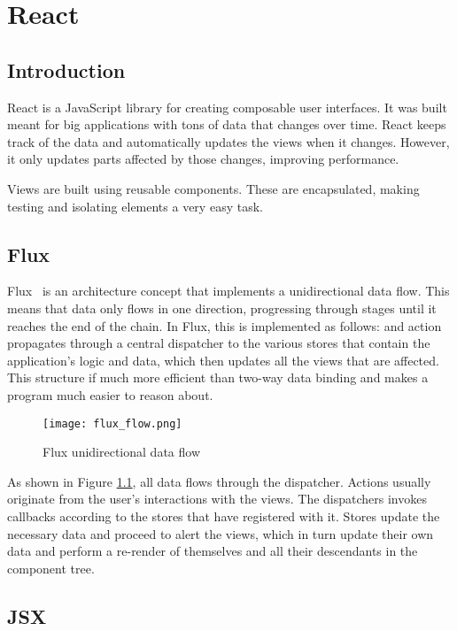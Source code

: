 \chapter{React}
\label{ch:react}
\justifying
\section{Introduction}

React is a JavaScript library for creating composable user interfaces. It was built meant for big applications with tons of data that changes over time. React keeps track of the data and automatically updates the views when it changes. However, it only updates parts affected by those changes, improving performance.

Views are built using reusable components. These are encapsulated, making testing and isolating elements a very easy task.

\section{Flux}

Flux~\cite{flux} is an architecture concept that implements a unidirectional data flow. This means that data only flows in one direction, progressing through stages until it reaches the end of the chain. In Flux, this is implemented as follows: and  action propagates through a central dispatcher to the various stores that contain the application's logic and data, which then updates all the views that are affected. This structure if much more efficient than two-way data binding and makes a program much easier to reason about.

\begin{figure}[H]
	\centering
	\texttt{[image: flux\_flow.png]}
	\caption{Flux unidirectional data flow\label{fig:fluxflow}}
\end{figure}

As shown in Figure \ref{fig:fluxflow}, all data flows through the dispatcher. Actions usually originate from the user's interactions with the views. The dispatchers invokes callbacks according to the stores that have registered with it. Stores update the necessary data and proceed to alert the views, which in turn update their own data and perform a re-render of themselves and all their descendants in the component tree.

\section{JSX}

